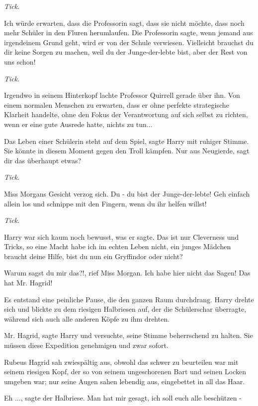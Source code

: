 \emph{Tick}.

\glqq Ich würde erwarten, dass die Professorin sagt, dass sie nicht möchte, dass
noch mehr Schüler in den Fluren herumlaufen. Die Professorin sagte, wenn jemand
aus irgendeinem Grund geht, wird er von der Schule verwiesen. Vielleicht
brauchst du dir keine Sorgen zu machen, weil du der Junge-der-lebte bist, aber
der Rest von uns schon!\grqq{}

\emph{Tick}.

Irgendwo in seinem Hinterkopf lachte Professor Quirrell gerade über ihn. Von
einem normalen Menschen zu erwarten, dass er ohne perfekte strategische Klarheit
handelte, ohne den Fokus der Verantwortung auf sich selbst zu richten, wenn er
eine gute Ausrede hatte, nichts zu tun...

\glqq Das Leben einer Schülerin steht auf dem Spiel\grqq{}, sagte Harry mit
ruhiger Stimme. \glqq Sie könnte in diesem Moment gegen den Troll kämpfen. Nur
aus Neugierde, sagt dir das überhaupt etwas?\grqq{}

\emph{Tick}.

Miss Morgans Gesicht verzog sich. \glqq Du - du bist der Junge-der-lebte! Geh
einfach allein los und schnippe mit den Fingern, wenn du ihr helfen
willst!\grqq{}

\emph{Tick}.

Harry war sich kaum noch bewusst, was er sagte. \glqq Das ist nur Cleverness und
Tricks, so eine Macht habe ich im echten Leben nicht, ein junges Mädchen braucht
deine Hilfe, bist du nun ein Gryffindor oder nicht?\grqq{}

\glqq Warum sagst du mir das?!\grqq{}, rief Miss Morgan. \glqq Ich habe hier
nicht das Sagen! Das hat Mr. Hagrid!\grqq{}

Es entstand eine peinliche Pause, die den ganzen Raum durchdrang. Harry drehte
sich und blickte zu dem riesigen Halbriesen auf, der die Schülerschar überragte,
während sich auch alle anderen Köpfe zu ihm drehten.

\glqq Mr. Hagrid\grqq{}, sagte Harry und versuchte, seine Stimme beherrschend zu
halten. \glqq Sie müssen diese Expedition genehmigen und zwar sofort.\grqq{}

Rubeus Hagrid sah zwiespältig aus, obwohl das schwer zu beurteilen war mit
seinem riesigen Kopf, der so von seinem ungeschorenen Bart und seinen Locken
umgeben war; nur seine Augen sahen lebendig aus, eingebettet in all das Haar.

\glqq Eh ...\grqq{}, sagte der Halbriese. \glqq Man hat mir gesagt, ich soll
euch alle beschützen -\grqq{}

